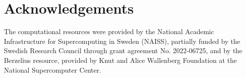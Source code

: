 \documentclass[a4paper]{article}
\begin{document}
\section*{Acknowledgements}

The computational resources were provided by the National Academic Infrastructure for Supercomputing in Sweden (NAISS), partially funded by the Swedish Research Council through grant agreement No. 2022-06725, and by the Berzelius resource, provided by Knut and Alice Wallenberg Foundation at the National Supercomputer Center.







\small{
% 

 
}

\newpage


\end{document}
